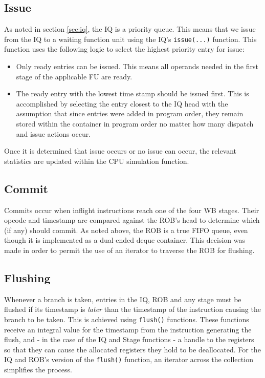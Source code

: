 \documentclass[12pt]{article}
\begin{document}
\subsection{Issue}
As noted in section \ref{sec:iq}, the IQ is a priority queue.
This means that we issue from the IQ to a waiting function unit using the IQ's \texttt{issue(...)} function.
This function uses the following logic to select the highest priority entry for issue:
\begin{itemize}
  \item Only ready entries can be issued. This means all operands needed in the first stage of the applicable FU are ready.
  \item The ready entry with the lowest time stamp should be issued first. This is accomplished by selecting the entry closest to the IQ head with the assumption that since entries were added in program order, they remain stored within the container in program order no matter how many dispatch and issue actions occur.
\end{itemize}
Once it is determined that issue occurs or no issue can occur, the relevant statistics are updated within the CPU simulation function.

\subsection{Commit}
Commits occur when inflight instructions reach one of the four WB stages. 
Their opcode and timestamp are compared against the ROB's head to determine which (if any) should commit. 
As noted above, the ROB is a true FIFO queue, even though it is implemented as a dual-ended deque container.
This decision was made in order to permit the use of an iterator to traverse the ROB for flushing.

\subsection{Flushing}
Whenever a branch is taken, entries in the IQ, ROB and any stage must be flushed if its timestamp is \textit{later} than the timestamp of the instruction causing the branch to be taken. 
This is achieved using \texttt{flush()} functions. 
These functions receive an integral value for the timestamp from the instruction generating the flush, and \-- in the case of the IQ and Stage functions \-- a handle to the registers so that they can cause the allocated registers they hold to be deallocated.
For the IQ and ROB's version of the \texttt{flush()} function, an iterator across the collection simplifies the process.
\end{document}
